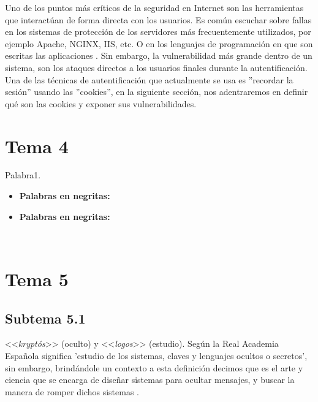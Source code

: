 \documentclass[12pt, a4paper, titlepage]{report}
\begin{document}
		Uno de los puntos más críticos de la seguridad en Internet son las herramientas que interactúan de forma directa con los usuarios. Es común escuchar sobre fallas en los sistemas de protección de los servidores más frecuentemente utilizados, por ejemplo Apache, NGINX, IIS, etc. O en los lenguajes de programación en que son escritas las aplicaciones \cite{refSeguridadWeb}. Sin embargo, la vulnerabilidad más grande dentro de un sistema, son los ataques directos a los usuarios finales durante la autentificación.\\
	    
	    Una de las técnicas de autentificación que actualmente se usa es ''recordar la sesión'' usando las ''cookies'', en la siguiente sección, nos adentraremos en definir qué son las cookies y exponer sus vulnerabilidades.
	    
	    \section{Tema 4}
	 \lipsum[4] \Gls{Palabra1}. \\
		
		\begin{itemize}
		    \item \textbf{Palabras en negritas:}  \lipsum[4]
		    \item \textbf{Palabras en negritas:} \lipsum[4]
        \end{itemize}
		
		 \lipsum[4] \cite{refCookies} \\
		
		\paragraph{}
		\lipsum[4]
		
		

	    \section{Tema 5}
	        \subsection{Subtema 5.1}
	            		\lipsum[4] <<\textit{kryptós}>> (oculto) y <<\textit{logos}>> (estudio). Según la Real Academia Española significa 'estudio de los sistemas, claves y lenguajes ocultos o secretos', sin embargo, brindándole un contexto a esta definición decimos que es el arte y ciencia que se encarga de diseñar sistemas para ocultar mensajes, y buscar la manera de romper dichos sistemas \cite{refCriptology}.\\
\end{document}
